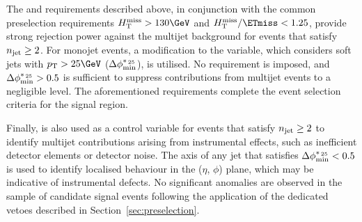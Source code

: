 The \alphat and \bdphi requirements described above, in conjunction
with the common preselection requirements $\HTmiss > 130\GeV$ and
$\HTmiss / \ETmiss < 1.25$, provide strong rejection power against the
multijet background for events that satisfy $n_{\text{jet}} \geq 2$. For
monojet events, a modification to the \bdphi variable, which considers
soft jets with $\Pt > 25\GeV$ ($\mbox{$\Delta\phi^{*_{\, 25}}_{\rm min}$}$), is utilised. No \alphat
requirement is imposed, and $\mbox{$\Delta\phi^{*_{\, 25}}_{\rm min}$} > 0.5$ is sufficient to
suppress contributions from multijet events to a negligible level.
The aforementioned requirements complete the event selection criteria
for the signal region.

Finally, \bdphimod is also used as a control variable for events that
satisfy $n_{\text{jet}} \geq 2$ to identify multijet contributions arising from
instrumental effects, such as inefficient detector elements or
detector noise. The axis of any jet that satisfies $\mbox{$\Delta\phi^{*_{\, 25}}_{\rm min}$} < 0.5$
is used to identify localised behaviour in the ($\eta$, $\phi$) plane,
which may be indicative of instrumental defects. No significant
anomalies are observed in the sample of candidate signal events
following the application of the dedicated vetoes described in
Section~\ref{sec:preselection}.



